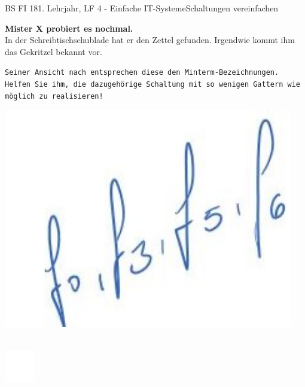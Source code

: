 \documentclass[oneside,openany,headings=optiontotoc,11pt,numbers=noenddot]{scrreprt}
\begin{document}
	\begin{worksheet}{BS FI 18}{1. Lehrjahr, LF 4 - Einfache IT-Systeme}{Schaltungen vereinfachen}
		\begin{framed}
			\noindent
			\begin{minipage}{0.58\textwidth}
				\textbf{Mister X probiert es nochmal.}\\
				In der Schreibtischschublade hat er den Zettel gefunden. Irgendwie kommt ihm das Gekritzel bekannt vor.
				\par
				\begin{addmargin}[0.75cm]{0cm}
					\texttt{Seiner Ansicht nach entsprechen diese den Minterm-Bezeichnungen.
						Helfen Sie ihm, die dazugehörige Schaltung mit so wenigen Gattern wie möglich zu realisieren!}\\
				\end{addmargin}
			\end{minipage}
			\hfill
			\begin{minipage}{0.4\textwidth}
				\includegraphics[width=0.95\textwidth]{../99_Bilder/mint.jpg}
			\end{minipage}
		\end{framed}
		\begin{framed}
			\noindent
			\tiny{\textit{\color{codegray}{Minterme}}}\\
			\normalsize
			\includegraphics[width=0.1\textwidth]{../../empty.jpg}\\
		\end{framed}

\end{worksheet}
\end{document}
